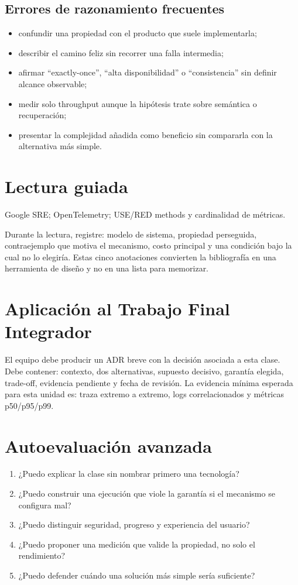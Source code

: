 \documentclass[variant=apuntes,cover=institutional,mode=screen]{ua-engineering-v6-article}
\begin{document}
\subsection{Errores de razonamiento frecuentes}
\begin{itemize}
\item confundir una propiedad con el producto que suele implementarla;
\item describir el camino feliz sin recorrer una falla intermedia;
\item afirmar ``exactly-once'', ``alta disponibilidad'' o ``consistencia'' sin definir alcance observable;
\item medir solo throughput aunque la hipótesis trate sobre semántica o recuperación;
\item presentar la complejidad añadida como beneficio sin compararla con la alternativa más simple.
\end{itemize}

\section{Lectura guiada}
Google SRE; OpenTelemetry; USE/RED methods y cardinalidad de métricas.

Durante la lectura, registre: modelo de sistema, propiedad perseguida, contraejemplo que motiva el mecanismo, costo principal y una condición bajo la cual no lo elegiría. Estas cinco anotaciones convierten la bibliografía en una herramienta de diseño y no en una lista para memorizar.

\section{Aplicación al Trabajo Final Integrador}
El equipo debe producir un ADR breve con la decisión asociada a esta clase. Debe contener: contexto, dos alternativas, supuesto decisivo, garantía elegida, trade-off, evidencia pendiente y fecha de revisión. La evidencia mínima esperada para esta unidad es: traza extremo a extremo, logs correlacionados y métricas p50/p95/p99.

\section{Autoevaluación avanzada}
\begin{enumerate}
\item ¿Puedo explicar la clase sin nombrar primero una tecnología?
\item ¿Puedo construir una ejecución que viole la garantía si el mecanismo se configura mal?
\item ¿Puedo distinguir seguridad, progreso y experiencia del usuario?
\item ¿Puedo proponer una medición que valide la propiedad, no solo el rendimiento?
\item ¿Puedo defender cuándo una solución más simple sería suficiente?
\end{enumerate}
\end{document}

